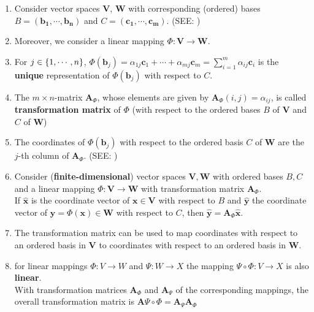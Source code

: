 \begin{enumerate}
    \item Consider vector spaces $\mathbf{V}$, $\mathbf{W}$ with corresponding (ordered) bases $\mathit{B} = \mathbf{(b_1, \cdots , b_n)}$ and $\mathit{C} = \mathbf{(c_1, \cdots , c_m)}$. (SEE: )

    \item Moreover, we consider a linear mapping $\Phi : \mathbf{V} \to \mathbf{W}$. 

    \item For $j \in \left\{1, \cdots , n\right\}$, \(     \displaystyle \Phi(\mathbf{b}_j) = \alpha_{1j}\mathbf{c}_1 + \cdots + \alpha_{mj}\mathbf{c}_m = \sum_{i=1}^{m} \alpha_{ij}\mathbf{c}_{i} \) is the \textbf{unique} representation of $\Phi(\mathbf{b}_j)$ with respect to $\mathit{C}$. 

    \item The $m \times n$-matrix $\mathbf{A}_\Phi$, whose elements are given by \( \mathbf{A}_\Phi(i, j) = \alpha_{ij} \), is called \textbf{transformation matrix} of $\Phi$ (with respect to the ordered bases $\mathit{B}$ of $\mathbf{V}$ and $\mathit{C}$ of $\mathbf{W}$)

    \item The coordinates of $\Phi(\mathbf{b}_j)$ with respect to the ordered basis $\mathit{C}$ of $\mathbf{W}$ are the $j$-th column of $\mathbf{A}_\Phi$. (SEE: )

    \item Consider (\textbf{finite-dimensional}) vector spaces $\mathbf{V, W}$ with ordered bases $\mathit{B, C}$ and a linear mapping $\Phi : \mathbf{V \to W}$ with transformation matrix $\mathbf{A}_\Phi$. \\
    If $\hat{\mathbf{x}}$ is the coordinate vector of $\mathbf{x} \in \mathbf{V}$ with respect to $\mathit{B}$ and $\hat{\mathbf{y}}$ the coordinate vector of $\mathbf{y} = \Phi(\mathbf{x}) \in \mathbf{W}$ with respect to $\mathit{C}$, then $\hat{\mathbf{y}} = \mathbf{A}_\Phi\hat{\mathbf{x}}$.

    \item The transformation matrix can be used to map coordinates with respect to an ordered basis in $\mathbf{V}$ to coordinates with respect to an ordered basis in $\mathbf{W}$.

    \item for linear mappings $\Phi : V \to W$ and $\Psi : W \to X$ the mapping $\Psi \circ \Phi : V \to X$ is also \textbf{linear}.\\
    With transformation matrices $\mathbf{A}_\Phi$ and $\mathbf{A}_\Psi$ of the corresponding mappings, the overall transformation matrix is $\mathbf{A}\Psi\circ\Phi = \mathbf{A}_\Psi \mathbf{A}_\Phi$


\end{enumerate}
